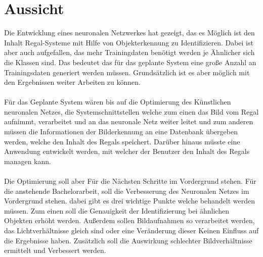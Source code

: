 \documentclass[a4paper,12pt,oneside]{article}
\begin{document}
\section{Aussicht}
Die Entwicklung eines neuronalen Netzwerkes hat gezeigt, das es Möglich ist den Inhalt Regal-Systeme mit Hilfe von Objekterkennung zu Identifizieren. Dabei ist aber auch aufgefallen, das mehr Trainingdaten benötigt werden je Ähnlicher sich die Klassen sind. Das bedeutet das für das geplante System eine große Anzahl an Trainingsdaten generiert werden müssen. Grundsätzlich ist es aber möglich mit den Ergebnissen weiter Arbeiten zu können.\\
\\
Für das Geplante System wären bis auf die Optimierung des Künstlichen neuronalen Netzes, die Systemschnittstellen welche zum einen das Bild vom Regal aufnimmt, verarbeitet und an das neuronale Netz weiter leitet und zum anderen müssen die Informationen der Bilderkennung an eine Datenbank übergeben werden, welche den Inhalt des Regals speichert. Darüber hinaus müsste eine Anwendung entwickelt werden, mit welcher der Benutzer den Inhalt des Regals managen kann.\\
\\
Die Optimierung soll aber Für die Nächsten Schritte im Vordergrund stehen. Für die anstehende Bachelorarbeit, soll die Verbesserung des Neuronalen Netzes im Vordergrund stehen. dabei gibt es drei wichtige Punkte welche behandelt werden müssen. Zum einen soll die Genauigkeit der Identifizierung bei ähnlichen Objekten erhöht werden. Außerdem sollen Bildaufnahmen so verarbeitet werden, das Lichtverhältnisse gleich sind oder eine Veränderung dieser Keinen Einfluss auf die Ergebnisse haben. Zusätzlich soll die Auswirkung schlechter Bildverhältnisse ermittelt und Verbessert werden.
   
  
  
\end{document}
